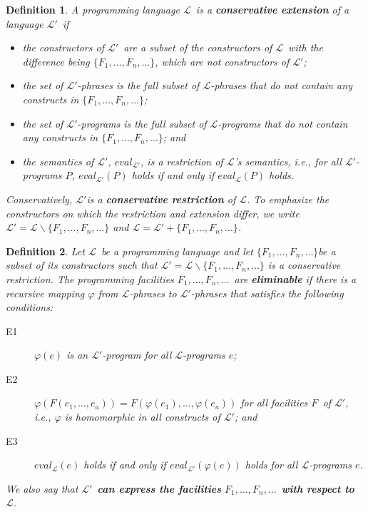 \documentclass{article}
\newcommand{\defn}[1]{\textbf{#1}}
\newcommand{\Lplain}{\ensuremath{\mathcal{L}}}
\newcommand{\Lprime}{\ensuremath{\Lplain'}}
\newcommand{\fac}{\ensuremath{F}}
\newcommand{\facs}{\ensuremath{\fac_1, \ldots, \fac_n, \ldots}}
\newcommand{\facset}{\ensuremath{\{\facs\}}}
\newcommand{\eval}[1]{\ensuremath{eval_#1}}
\newtheorem{definition}{Definition}[section]
\begin{document}
\begin{definition}
A programming language \Lplain\ is a \defn{conservative extension}
of a language \Lprime\ if
\begin{itemize}
\item the constructors of \Lprime\ are a subset of the constructors of 
      \Lplain\ with the difference being \facset, which are not
      constructors of \Lprime;
\item the set of \Lprime-phrases is the full subset of \Lplain-phrases 
      that do not contain any constructs in \facset;
\item the set of \Lprime-programs is the full subset of
      \Lplain-programs that do not contain any constructs in \facset;
      and
\item the semantics of \Lprime, \eval{\Lprime}, is a restriction of
      \Lplain's semantics, i.e., for all \Lprime-programs $P$,
      \eval{\Lprime}$(P)$ holds if and only if \eval{\Lplain}$(P)$
      holds.
\end{itemize}
Conservatively, \Lprime is a \defn{conservative restriction} of
\Lplain.  To emphasize the constructors on which the restriction and
extension differ, we write $\Lprime = \Lplain \backslash \facset$ and
$\Lplain = \Lprime + \facset$.
\end{definition}

\begin{definition}
Let \Lplain\ be a programming language and let \facset be a subset of
its constructors such that $\Lprime = \Lplain \backslash \facset$ is a 
conservative restriction.  The programming facilities \facs\ are
\defn{eliminable} if there is a recursive mapping $\varphi$ from
\Lplain-phrases to \Lprime-phrases that satisfies the following
conditions:
\begin{description}
\item[E1] $\varphi(e)$ is an \Lprime-program for all \Lplain-programs
	  $e$;
\item[E2] $\varphi(\fac(e_1, \ldots, e_a)) = \fac(\varphi(e_1),
	  \ldots, \varphi(e_a))$ for all facilities \fac\ of \Lprime,
	  i.e., $\varphi$ is homomorphic in all constructs of \Lprime;
	  and
\item[E3] $\eval{\Lplain}(e)$ holds if and only if
	  $\eval{\Lprime}(\varphi(e))$ holds for all \Lplain-programs
	  $e$.
\end{description}
We also say that \Lprime\ \defn{can express the facilities} \facs\ 
\defn{with respect to} \Lplain.
\end{definition}
\end{document}
